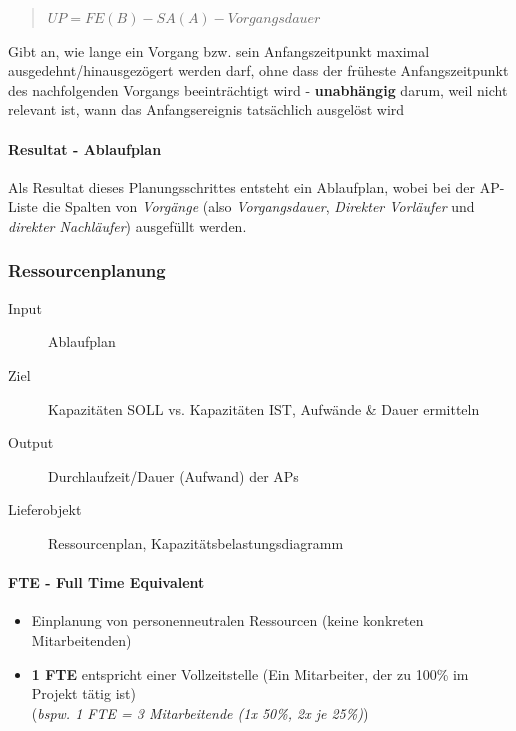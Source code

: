 \documentclass[a4paper]{article}
\begin{document}
			\begin{quote}
				$UP = FE(B) - SA(A) - Vorgangsdauer$
			\end{quote}
			\noindent
			Gibt an, wie lange ein Vorgang bzw. sein Anfangszeitpunkt maximal ausgedehnt/hinausgezögert werden darf, ohne dass der früheste Anfangszeitpunkt des nachfolgenden Vorgangs beeinträchtigt wird - \textbf{unabhängig} darum, weil nicht relevant ist, wann das Anfangsereignis tatsächlich ausgelöst wird
			
			\paragraph{Resultat - Ablaufplan}
			
			Als Resultat dieses Planungsschrittes entsteht ein Ablaufplan, wobei bei der AP-Liste die Spalten von \textit{Vorgänge} (also \textit{Vorgangsdauer}, \textit{Direkter Vorläufer} und \textit{direkter Nachläufer}) ausgefüllt werden.
			
\newpage

			\subsubsection{Ressourcenplanung}
			
			\begin{description}
				\item[Input] Ablaufplan
				\item[Ziel] Kapazitäten SOLL vs. Kapazitäten IST, Aufwände \& Dauer ermitteln
				\item[Output] Durchlaufzeit/Dauer (Aufwand) der APs
				\item[Lieferobjekt] Ressourcenplan, Kapazitätsbelastungsdiagramm
			\end{description}
		
			\paragraph{FTE - Full Time Equivalent}
			
			\begin{itemize}
				\item Einplanung von personenneutralen Ressourcen (keine konkreten Mitarbeitenden)
				\item \textbf{1 FTE} entspricht einer Vollzeitstelle (Ein Mitarbeiter, der zu 100\% im Projekt tätig ist)\\
				(\textit{bspw. 1 FTE = 3 Mitarbeitende (1x 50\%, 2x je 25\%)})
			\end{itemize}
		
\end{document}

